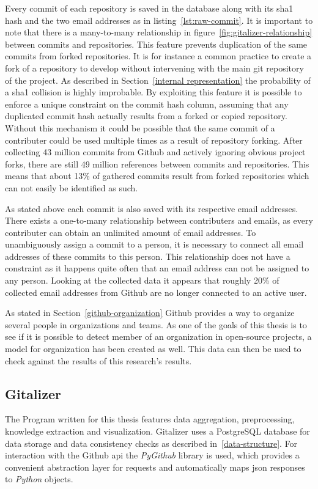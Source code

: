 Every commit of each repository is saved in the database along with its \ac{sha1} hash and the two email addresses as in listing~\ref{lst:raw-commit}.
It is important to note that there is a many-to-many relationship in figure~\ref{fig:gitalizer-relationship} between commits and repositories.
This feature prevents duplication of the same commits from forked repositories.
It is for instance a common practice to create a fork of a repository to develop without intervening with the main git repository of the project.
As described in Section~\ref{internal representation} the probability of a \ac{sha1} collision is highly improbable.
By exploiting this feature it is possible to enforce a unique constraint on the commit hash column, assuming that any duplicated commit hash actually results from a forked or copied repository.
Without this mechanism it could be possible that the same commit of a contributer could be used multiple times as a result of repository forking.
After collecting 43 million commits from Github and actively ignoring obvious project forks, there are still 49 million references between commits and repositories.
This means that about 13\% of gathered commits result from forked repositories which can not easily be identified as such.

As stated above each commit is also saved with its respective email addresses.
There exists a one-to-many relationship between contributers and emails, as every contributer can obtain an unlimited amount of email addresses.
To unambiguously assign a commit to a person, it is necessary to connect all email addresses of these commits to this person.
This relationship does not have a  constraint as it happens quite often that an email address can not be assigned to any person.
Looking at the collected data it appears that roughly 20\% of collected email addresses from Github are no longer connected to an active user.

As stated in Section~\ref{github-organization} Github provides a way to organize several people in organizations and teams.
As one of the goals of this thesis is to see if it is possible to detect member of an organization in open-source projects, a model for organization has been created as well.
This data can then be used to check against the results of this research's results.


\subsection{Gitalizer}
The Program written for this thesis features data aggregation, preprocessing, knowledge extraction and visualization.
Gitalizer uses a PostgreSQL database for data storage and data consistency checks as described in~\ref{data-structure}.
For interaction with the Github \ac{api} the \emph{PyGithub} library is used, which provides a convenient abstraction layer for requests and automatically maps \ac{json} responses to \emph{Python} objects.

